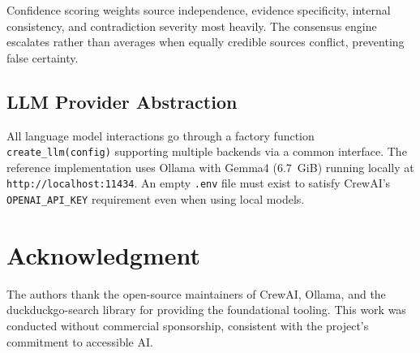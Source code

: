 \documentclass[conference]{IEEEtran}
\begin{document}
Confidence scoring weights source independence, evidence specificity, internal consistency, and contradiction severity most heavily. The consensus engine escalates rather than averages when equally credible sources conflict, preventing false certainty.

\subsection{LLM Provider Abstraction}

All language model interactions go through a factory function \texttt{create\_llm(config)} supporting multiple backends via a common interface. The reference implementation uses Ollama with Gemma4 (6.7~GiB) running locally at \texttt{http://localhost:11434}. An empty \texttt{.env} file must exist to satisfy CrewAI's \texttt{OPENAI\_API\_KEY} requirement even when using local models.

\section*{Acknowledgment}

The authors thank the open-source maintainers of CrewAI, Ollama, and the duckduckgo-search library for providing the foundational tooling. This work was conducted without commercial sponsorship, consistent with the project's commitment to accessible AI.
\end{document}
